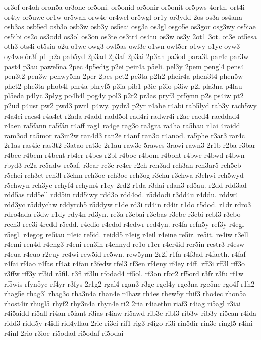 {or3of
or4oh
oron5a
or3one
or5oni.
or5onid
or5onir
or5onit
or5pws
4orth.
ort4i
or4ty
or5uwc
or1w
or5wah
orw4e
or4wel
or5wgl
or1y
or3ydd
2os
os3a
os4ana
osb3as
osb5ed
osb3o
osb3w
osb3y
os5eai
osg3a
os3gl
osgo5e
os3gor
osg3wy
os5iae
os5ibi
os2o
os3odd
os3ol
os3on
os3te
os3tr4
os4tu
os3w
os3y
2ot1
3ot.
ot3e
ot5esa
oth3
ots4i
ot5sia
o2u
o1wc
owg3
owl5as
owl3e
o1wn
owt5er
o1wy
o1yc
oyw3
oy4we
^^f4r3f
p1
p2a
pab5yd
2p3ad
2p3af
2p3ai
2p3an
pa3od
para3t
par4c
par3w
past4
p3au
pawe5na
2pec
4p5edig
p2ei
peir4a
p5eli.
pel3y
2pem
pengl4
pens4
pen3t2
pen3w
penwy5na
2per
2pes
pet2
pe3ta
p2h2
pheir4a
phen3t4
phen5w
phet2
phe3ta
phob4l
phr4a
phryf5
p3ia
pib1
p3ie
p3io
p3iw
p2l
pla3na
p4lau
pl5eda
p4lyc
3plyg
po4b4l
pog4y
pol3
p2r2
pr3as
pryf3
pr5ynn
p2s
ps4iw
pt2
p2ud
p4usr
pw2
pwd3
pwr1
p4wy.
pydr3
p2yr
r4abe
r4abi
rab5lyd
rab3y
rach5wy
r4a4ci
racs4
r4a4ct
r2ada
r4add
radd5ol
rad4ri
radwr4i
r2ae
raed4
raeddad4
r4aen
ra5fann
ra5f^^e1n
r4aff
rag1
ra4ge
rag3o
ra3gra
ra4ha
ra5hau
r1ai
4raidd
ram3od
ra5mor
ra3m2w
ran4d3
ran2e
r4anf
ran3o
r4anod.
ra5phe
r3ar3
rar4c
2r1as
ras4ie
ras3t2
r3atao
rat3e
2r1au
raw3e
5rawes
3rawi
rawn3
2r1b
r2ba
r3bar
r4bec
r4bem
r4bent
rb4er
r4bes
r2bl
r4boc
r4bom
r4bont
r4bwc
r4bwd
r4bwn
rbyd3
rc2a
rc5adw
rc5af.
r3car
rc3e
rc4er
r2ch
rch3ad
rch3an
rch3ar5
rch5eb
r5chei
rch3et
rch3l
r3chm
rch3oc
rch3oe
rch3og
r3chu
r3chwa
r3chwi
rch5wyd
r5chwyn
rch3yc
rchyf4
rchym4
r1cy
2rd2
r1da
r3dai
rdan3
rd5au.
r2dd
rdd3ad
rdd5as
rdd5ell
rdd5in
rdd5iwy
rdd3o
rdd4od.
r5ddodi
r3dd4u
r4ddu.
rddw4
rdd3yc
r5ddychw
rddyrch5
r5ddyw
r1de
rd3i
rd4in
rd4ir
r1do
r5dod.
r1dr
rdro3
rdro4ada
r3dw
r1dy
rdy4n
rd3yn.
re3a
r3ebai
r3ebas
r3ebe
r3ebi
rebl3
r3ebo
rech3
rec3i
4redd
r5edd.
r4edio
r4edol
r4edwr
red4yn.
re4fa
refn5y
ref3y
r4egl
r5egl.
r4egog
re5iau
r4eic
re5id.
reidd5
r4eig
r4eil
r4eine
re5ir.
re5it.
re4iw
r3ell
r4emi
ren4d
r4eng3
r4eni
ren3in
r4ennyd
re1o
r1er
r4er4id
rer5in
restr3
r4esw
r4eua
r4euo
r2euy
re4wi
rew5id
re5wn.
rew5ynn
2r2f
r1fa
r4f3ad
r4faeth.
r4faf
r4fai
rf4ao
r4fas
rf4at
r4fau
r3fedw
rfel3
rf3en
rf4eny
rf4ey
r4ff.
rff3i
rff3l
rff3o
r3ffw
rff3y
rf3id
r5fil.
r3fl
rf3lu
rfodad4
rf5ol.
rf3on
rfor2
rf5ord
r3fr
r3fu
rf1w
rf5wis
rfyn5yc
rf4yr
r3fys
2r1g2
rgal4
rgan3
r3ge
rgel4y
rge3na
rge5ne
rgo4f
r1h2
rhag5e
rhag3l
rhag3o
rha3n4a
rhan4e
r4haw
rh4es
rhew5y
rhif3
rho4ec
rhon5a
rhost4ir
rhugl5
rhyf2
rhy3n4a
rhyn4e
ri2
2ria
r4iaethu
riaf3
r4iag
ri5agl
r3iai
r4i5aidd
ri5all
ri4an
r5iant
r3ias
r4iaw
ri5awd
rib3e
ribl3
rib3w
rib3y
ri5can
r4ida
ridd3
ridd5y
r4idi
rid4yllau
2rie
ri3ei
rif1
rig3
r4igo
ri3i
rin5dir
rin3e
ringl5
r4ini
r4inl
2rio
r3ioc
ri5odad
ri5odaf
ri5odai
}
